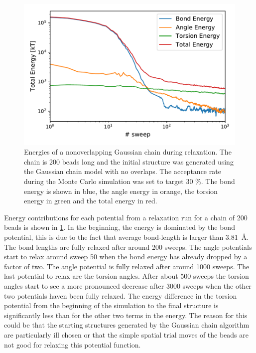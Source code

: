 \documentclass[12pt, twoside]{report}
\begin{document}
\begin{figure}[!ht] \centering
\includegraphics[width=.8\textwidth]{figures/linker-relaxation}
\caption[Monte-Carlo relaxation simulation of a Gaussian polymer
chain.]{Energies of a nonoverlapping Gaussian chain during relaxation. The chain
is 200 beads long and the initial structure was generated using the Gaussian
chain model with no overlaps. The acceptance rate during the Monte Carlo
simulation was set to target 30 \%. The bond energy is shown in blue, the angle
energy in orange, the torsion energy in green and the total energy in red.}
\label{fig:linker-relaxation}
\end{figure} Energy contributions for each potential from a relaxation run for a
chain of 200 beads is shown in \cref{fig:linker-relaxation}. In the beginning,
the energy is dominated by the bond potential, this is due to the fact that
average bond-length is larger than \SI{3.81}{\AA}. The bond lengths are fully
relaxed after around 200 sweeps. The angle potentials start to relax around
sweep 50 when the bond energy has already dropped by a factor of two. The angle
potential is fully relaxed after around 1000 sweeps. The last potential to relax
are the torsion angles. After about 500 sweeps the torsion angles start to see a
more pronounced decrease after 3000 sweeps when the other two potentials haven
been fully relaxed. The energy difference in the torsion potential from the
beginning of the simulation to the final structure is significantly less than
for the other two terms in the energy. The reason for this could be that the
starting structures generated by the Gaussian chain algorithm are particularly
ill chosen or that the simple spatial trial moves of the beads are not good for
relaxing this potential function.
\end{document}
